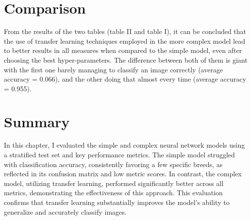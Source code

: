 \section{Comparison}
From the results of the two tables (table II and table I), it can be concluded that the use of transfer learning techniques employed in the more complex model lead to better results in all measures when compared to the simple model, even after choosing the best hyper-parameters. The difference between both of them is giant with the first one barely managing to classify an image correctly (average accuracy = 0.066), and the other doing that almost every time (average accuracy = 0.955).
\section{Summary}
In this chapter, I evaluated the simple and complex neural network models using a stratified test set and key performance metrics. The simple model struggled with classification accuracy, consistently favoring a few specific breeds, as reflected in its confusion matrix and low metric scores. In contrast, the complex model, utilizing transfer learning, performed significantly better across all metrics, demonstrating the effectiveness of this approach. This evaluation confirms that transfer learning substantially improves the model's ability to generalize and accurately classify images.